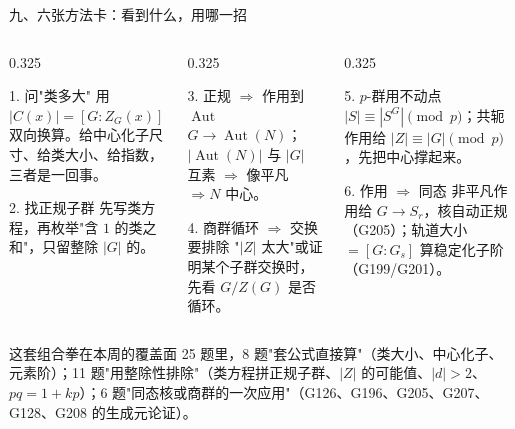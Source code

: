 \documentclass[aspectratio=169,10pt,fontset=none]{ctexbeamer}
\begin{document}
\begin{frame}[t]{九、六张方法卡：看到什么，用哪一招}
  \begin{columns}[T,onlytextwidth]
    \begin{column}{0.325\textwidth}
      \begin{block}{\footnotesize 1. 问"类多大"}
        \scriptsize 用 $|C(x)|=[G:Z_G(x)]$ 双向换算。给中心化子尺寸、给类大小、给指数，三者是一回事。\par\vspace{1pt}
      \end{block}
      \begin{block}{\footnotesize 2. 找正规子群}
        \scriptsize 先写类方程，再枚举"含 $1$ 的类之和"，只留整除 $|G|$ 的。\par\vspace{1pt}
      \end{block}
    \end{column}
    \begin{column}{0.325\textwidth}
      \begin{block}{\footnotesize 3. 正规 $\Rightarrow$ 作用到 $\operatorname{Aut}$}
        \scriptsize $G\to\operatorname{Aut}(N)$；$|\operatorname{Aut}(N)|$ 与 $|G|$ 互素 $\Rightarrow$ 像平凡 $\Rightarrow N$ 中心。\par\vspace{1pt}
      \end{block}
      \begin{block}{\footnotesize 4. 商群循环 $\Rightarrow$ 交换}
        \scriptsize 要排除 "$|Z|$ 太大"或证明某个子群交换时，先看 $G/Z(G)$ 是否循环。\par\vspace{1pt}
      \end{block}
    \end{column}
    \begin{column}{0.325\textwidth}
      \begin{block}{\footnotesize 5. $p$-群用不动点}
        \scriptsize $|S|\equiv|S^G|\pmod p$；共轭作用给 $|Z|\equiv|G|\pmod p$，先把中心撑起来。\par\vspace{1pt}
      \end{block}
      \begin{block}{\footnotesize 6. 作用 $\Rightarrow$ 同态}
        \scriptsize 非平凡作用给 $G\to S_r$，核自动正规（G205）；轨道大小 $=[G:G_s]$ 算稳定化子阶（G199/G201）。\par\vspace{1pt}
      \end{block}
    \end{column}
  \end{columns}
  \vspace{0.15em}
  \begin{exampleblock}{\footnotesize 这套组合拳在本周的覆盖面}
    \scriptsize
    25 题里，8 题"套公式直接算"（类大小、中心化子、元素阶）；11 题"用整除性排除"（类方程拼正规子群、$|Z|$ 的可能值、$|d|>2$、$pq=1+kp$）；6 题"同态核或商群的一次应用"（G126、G196、G205、G207、G128、G208 的生成元论证）。
  \end{exampleblock}
\end{frame}
\end{document}
